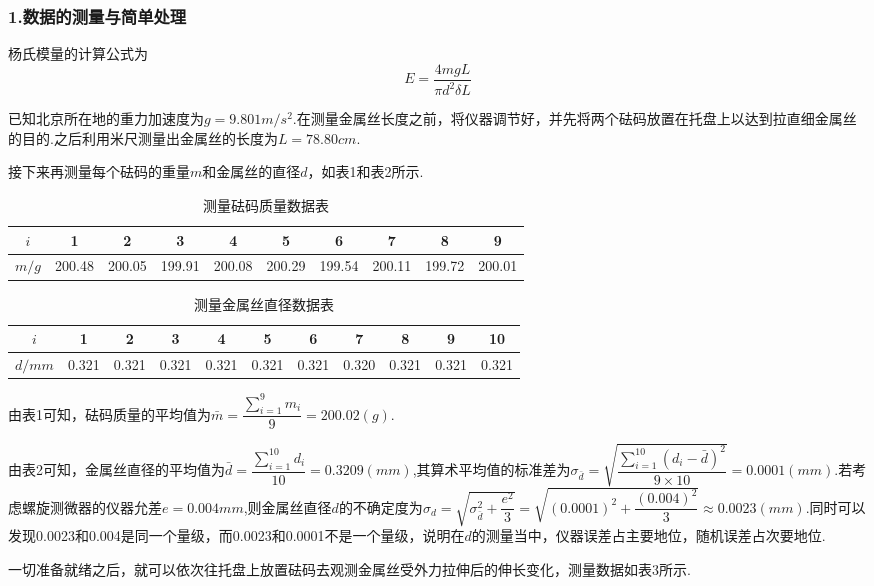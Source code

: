\documentclass[12pt,a4paper,UTF8]{ctexart}
\begin{document}
\subsubsection*{1.数据的测量与简单处理}
杨氏模量的计算公式为
$$
E=\frac{4mgL}{\pi d^2 \delta L}
$$
\par
已知北京所在地的重力加速度为$g=9.801m/s^2$.在测量金属丝长度之前，将仪器调节好，并先将两个砝码放置在托盘上以达到拉直细金属丝的目的.之后利用米尺测量出金属丝的长度为$L=78.80cm$.\par
接下来再测量每个砝码的重量$m$和金属丝的直径$d$，如表1和表2所示.
\begin{table}[htbp]
\centering
\caption{测量砝码质量数据表}
\begin{tabular}{cccccccccc}
\toprule
$i$&1&2&3&4&5&6&7&8&9 \\
\hline
$m/g$&200.48&200.05&199.91&200.08&200.29&199.54&200.11&199.72&200.01 \\
\bottomrule
\end{tabular}
\end{table}	
\newpage
\begin{table}[htbp]
\centering
\caption{测量金属丝直径数据表}
\begin{tabular}{ccccccccccc}
\toprule
$i$&1&2&3&4&5&6&7&8&9&10 \\
\hline
$d/mm$&0.321&0.321&0.321&0.321&0.321&0.321&0.320&0.321&0.321&0.321 \\
\bottomrule
\end{tabular}
\end{table}
由表1可知，砝码质量的平均值为$\bar m=\dfrac{\sum_{i=1}^{9}m_i}{9}=200.02(g)$.\par
由表2可知，金属丝直径的平均值为$\bar d=\dfrac{\sum_{i=1}^{10}d_i}{10}=0.3209(mm)$,其算术平均值的标准差为$\sigma_{\bar d}=\sqrt{\dfrac{\sum_{i=1}^{10}(d_i-\bar d)^2}{9\times10}}=0.0001(mm)$.若考虑螺旋测微器的仪器允差$e=0.004mm$,则金属丝直径$d$的不确定度为$\sigma_d=\sqrt{\sigma_{\bar d}^2+\dfrac{e^2}{3}}=\sqrt{(0.0001)^2+\dfrac{(0.004)^2}{3}}\approx 0.0023(mm)$.同时可以发现0.0023和0.004是同一个量级，而0.0023和0.0001不是一个量级，说明在$d$的测量当中，仪器误差占主要地位，随机误差占次要地位.\par
一切准备就绪之后，就可以依次往托盘上放置砝码去观测金属丝受外力拉伸后的伸长变化，测量数据如表3所示.
\end{document}
